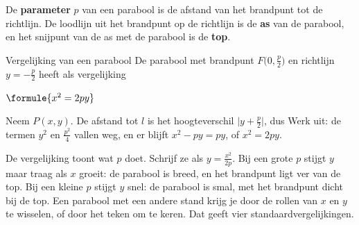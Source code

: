 \begin{theorie}
De \textbf{\textcolor{accent}{parameter}} $p$ van een parabool is de afstand van het brandpunt tot de richtlijn. De loodlijn uit het brandpunt op de richtlijn is de \textbf{\textcolor{accent}{as}} van de parabool, en het snijpunt van de as met de parabool is de \textbf{\textcolor{accent}{top}}.

\begin{minipage}[t]{.62\linewidth}
\vspace{0pt}
\begin{stelling}{Vergelijking van een parabool}
De parabool met brandpunt ${F\bigl(0, \tfrac p2\bigr)}$ en richtlijn ${y = -\tfrac p2}$ heeft als vergelijking

\vspace{1mm}
\qquad $\formule{x^2 = 2py}$
\end{stelling}

\begin{bewijs}
Neem $P(x, y)$. De afstand tot $l$ is het hoogteverschil ${\bigl|y + \tfrac p2\bigr|}$, dus
Werk uit: de termen $y^2$ en $\tfrac{p^2}{4}$ vallen weg, en er blijft $x^2 - py = py$, of $x^2 = 2py$.
\end{bewijs}
\end{minipage}\hfill
\begin{minipage}[t]{.34\linewidth}
\vspace{0pt}
\centering
{}
\end{minipage}
\end{theorie}

De vergelijking toont wat $p$ doet. Schrijf ze als $y = \tfrac{x^2}{2p}$. Bij een grote $p$ stijgt $y$ maar traag als $x$ groeit: de parabool is breed, en het brandpunt ligt ver van de top. Bij een kleine $p$ stijgt $y$ snel: de parabool is smal, met het brandpunt dicht bij de top. Een parabool met een andere stand krijg je door de rollen van $x$ en $y$ te wisselen, of door het teken om te keren. Dat geeft vier standaardvergelijkingen.

